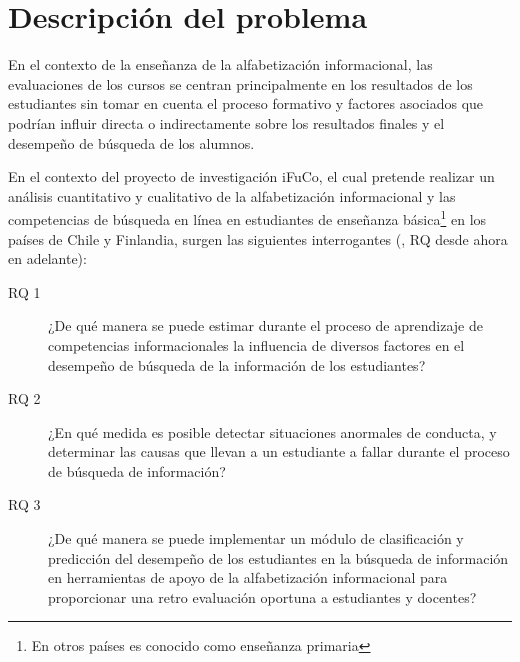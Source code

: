 \section{Descripción del problema}
\label{sec:descripcion-problema}
En el contexto de la enseñanza de la alfabetización informacional, las evaluaciones de los cursos se centran principalmente en los resultados de los estudiantes sin tomar en cuenta el proceso formativo y factores asociados que podrían influir directa o indirectamente sobre los resultados finales y el desempeño de búsqueda de los alumnos.  

En el contexto del proyecto de investigación iFuCo, el cual pretende realizar un análisis cuantitativo y cualitativo de la alfabetización informacional y las competencias de búsqueda en línea en estudiantes de enseñanza básica\footnote{En otros países es conocido como enseñanza primaria} en los países de Chile y Finlandia, surgen las siguientes interrogantes (, RQ desde ahora en adelante):

\begin{description}
	\item [RQ 1] ¿De qué manera se puede estimar durante el proceso de aprendizaje de competencias informacionales la influencia de diversos factores en el desempeño de búsqueda de la información de los estudiantes?
	\item [RQ 2] ¿En qué medida es posible detectar situaciones anormales de conducta, y determinar las causas que llevan a un estudiante a fallar durante el proceso de búsqueda de información? 
	\item [RQ 3] ¿De qué manera se puede implementar un módulo de clasificación y predicción del desempeño de los estudiantes en la búsqueda de información en herramientas de apoyo de la alfabetización informacional para proporcionar una retro evaluación oportuna a estudiantes y docentes?
\end{description}